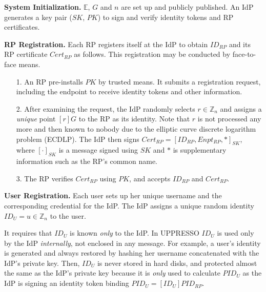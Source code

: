 \noindent \textbf{System Initialization.}
$\mathbb{E}$, $G$ and $n$ are set up and publicly published.
An IdP generates a key pair ($SK$, $PK$) to sign and verify identity tokens and RP certificates.


\noindent\textbf{RP Registration.}
Each RP registers itself at the IdP to obtain $ID_{RP}$ and its RP certificate $Cert_{RP}$ as follows.
This registration may be conducted by face-to-face means.
\begin{enumerate}
\setlength{\topsep}{0pt}
\setlength{\partopsep}{0pt}
\setlength{\itemsep}{0pt}
\setlength{\parsep}{0pt}
\setlength{\parskip}{0pt}
\item[1.]
An RP pre-installs $PK$ by trusted means.
It submits a registration request, including the endpoint to receive identity tokens and other information.
\item[2.]
After examining the request,
the IdP randomly selects $r \in \mathbb{Z}_n$
        and assigns a \emph{unique} point $[r]G$ to the RP as its identity.
Note that $r$ is not processed any more and then known to nobody
 due to the elliptic curve discrete logarithm problem (ECDLP).
The IdP then signs $Cert_{RP} = [ID_{RP}, Enpt_{RP}, *]_{SK}$,
     where $[\cdot]_{SK}$ is a message signed using $SK$ and $*$ is supplementary information such as the RP's common name.
\item[3.]
The RP verifies $Cert_{RP}$ using $PK$, and accepts $ID_{RP}$ and $Cert_{RP}$.
\end{enumerate}


\noindent\textbf{User Registration.}
Each user sets up her unique username and the corresponding credential for the IdP.
The IdP assigns
a unique random identity $ID_U = u\in \mathbb{Z}_n$ to the user.

It requires that $ID_U$ is known \emph{only} to the IdP.
In UPPRESSO $ID_U$ is used only by the IdP \emph{internally},
 not enclosed in any message.
For example, a user's identity is generated and always restored by hashing her username concatenated with the IdP's private key.
Then,
 $ID_U$ is never stored in hard disks,
 and protected almost the same as the IdP's private key
because it is \emph{only} used to calculate $PID_{U}$ as the IdP is signing an identity token binding $PID_{U}=
  [{ID_U}]{PID_{RP}}$.


